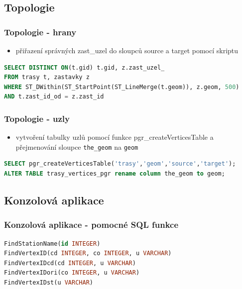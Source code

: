 \documentclass{beamer}
\begin{document}
\begin{frame}[fragile]
\section{Topologie}
\frametitle{Topologie - hrany}	
\begin{itemize}
	\item přiřazení správných zast\_uzel do sloupců source a target pomocí skriptu
\end{itemize}
\begin{exampleblock}{}
\begin{lstlisting}[language=sql]
SELECT DISTINCT ON(t.gid) t.gid, z.zast_uzel_ 
FROM trasy t, zastavky z 
WHERE ST_DWithin(ST_StartPoint(ST_LineMerge(t.geom)), z.geom, 500) 
AND t.zast_id_od = z.zast_id
\end{lstlisting}
\end{exampleblock}

\end{frame}

\begin{frame}[fragile]
\frametitle{Topologie - uzly}	

\begin{itemize}
	\item vytvoření tabulky uzlů pomocí funkce pgr\_createVerticesTable a přejmenování sloupce \texttt{the\_geom} na \texttt{geom}
\end{itemize}

\begin{exampleblock}{}
\begin{lstlisting}[language=sql]
SELECT pgr_createVerticesTable('trasy','geom','source','target');
ALTER TABLE trasy_vertices_pgr rename column the_geom to geom;
\end{lstlisting}
\end{exampleblock}

\end{frame}

\begin{frame}[fragile]
\section{Konzolová aplikace}
\frametitle{Konzolová aplikace - pomocné SQL funkce}
\begin{exampleblock}{}
\begin{lstlisting}[language=sql]
FindStationName(id INTEGER)
FindVertexID(cd INTEGER, co INTEGER, u VARCHAR)
FindVertexIDcd(cd INTEGER, u VARCHAR)
FindVertexIDori(co INTEGER, u VARCHAR)
FindVertexIDst(u VARCHAR)
\end{lstlisting}
\end{exampleblock}
\end{frame}
\end{document}
